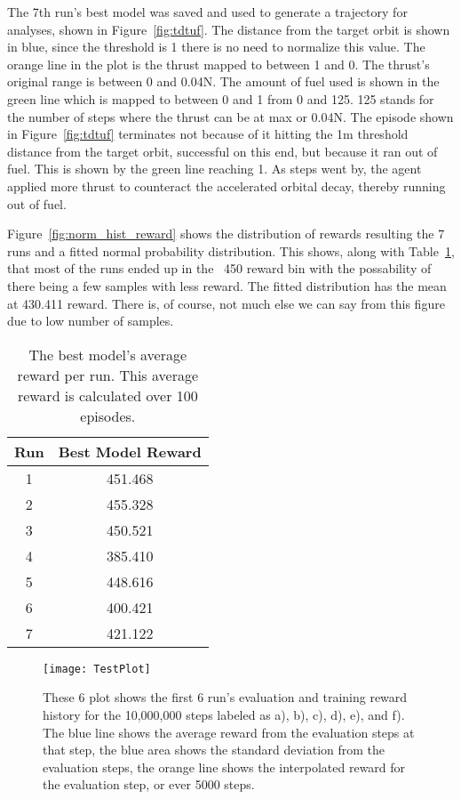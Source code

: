 The 7th run's best model was saved and used to generate a trajectory for analyses, shown in Figure~\ref{fig:tdtuf}. The distance from the target orbit is shown in blue, since the threshold is 1 there is no need to normalize this value. The orange line in the plot is the thrust mapped to between 1 and 0. The thrust's original range is between 0 and 0.04\si{N}. The amount of fuel used is shown in the green line which is mapped to between 0 and 1 from 0 and 125. 125 stands for the number of steps where the thrust can be at max or 0.04\si{N}. The episode shown in Figure~\ref{fig:tdtuf} terminates not because of it hitting the 1\si{m} threshold distance from the target orbit, successful on this end, but because it ran out of fuel. This is shown by the green line reaching 1. As steps went by, the agent applied more thrust to counteract the accelerated orbital decay, thereby running out of fuel.

Figure~\ref{fig:norm_hist_reward} shows the distribution of rewards resulting the 7 runs and a fitted normal probability distribution. This shows, along with Table~\ref{fig:validation_runs}, that most of the runs ended up in the ~450 reward bin with the possability of there being a few samples with less reward. The fitted distribution has the mean at 430.411 reward. There is, of course, not much else we can say from this figure due to low number of samples.   

\begin{table}
	\centering
	\begin{tabular}{|c|c|} \hline
		Run & Best Model Reward \\\hline\hline
		1 & 451.468 \\\hline
		2 & 455.328 \\\hline
		3 & 450.521 \\\hline
		4 & 385.410 \\\hline
		5 & 448.616 \\\hline
		6 & 400.421 \\\hline
		7 & 421.122 \\\hline
	\end{tabular}
	\caption{The best model's average reward per run. This average reward is calculated over 100 episodes.}
	\label{table:best_evaluation_rewards}
\end{table}

\begin{figure}
	\centering
	\texttt{[image: TestPlot]}
	\caption{These 6 plot shows the first 6 run's evaluation and training reward history for the 10,000,000 steps labeled as a), b), c), d), e), and f). The blue line shows the average reward from the evaluation steps at that step, the blue area shows the standard deviation from the evaluation steps, the orange line shows the interpolated reward for the evaluation step, or ever 5000 steps. }
	\label{fig:validation_runs}
\end{figure}


